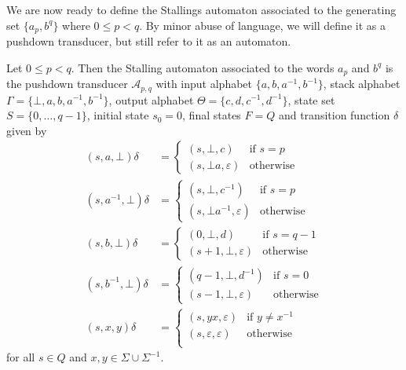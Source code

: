 We are now ready to define the Stallings automaton associated to the generating set $\{a_p, b^q\}$ where
$0 \leq p < q$. By minor abuse of language, we will define it as a pushdown transducer, but still refer to it
as an automaton.

\begin{definition}%
  \label{def:Stallings_automaton}
  \rocqok{}
  Let $0 \leq p < q$. Then the Stalling automaton associated to the words $a_p$ and $b^q$ is the pushdown transducer
  $\mathcal{A}_{p, q}$ with input alphabet $\{a, b, a^{-1}, b^{-1}\}$, stack alphabet
  $\Gamma = \{\bot, a, b, a^{-1}, b^{-1}\}$,
  output alphabet $\Theta = \{c, d, c^{-1}, d^{-1}\}$, state set $S = \{0, \ldots, q-1\}$, initial state $s_0 = 0$,
  final states $F = Q$ and transition function $\delta$ given by
  \begin{align*}
    (s, a, \bot)\delta &= \begin{cases}
      (s, \bot, c) & \textrm{if }s=p\\
      (s, \bot a, \varepsilon) & \textrm{otherwise}
    \end{cases} \\
    (s, a^{-1}, \bot)\delta &= \begin{cases}
      (s, \bot, c^{-1}) & \textrm{if }s=p\\
      (s, \bot a^{-1}, \varepsilon) & \textrm{otherwise}
    \end{cases} \\
    (s, b, \bot)\delta &= \begin{cases}
      (0, \bot, d) & \textrm{if }s = q - 1\\
      (s+1, \bot, \varepsilon) & \textrm{otherwise}
    \end{cases} \\
    (s, b^{-1}, \bot)\delta &= \begin{cases}
      (q-1, \bot, d^{-1}) & \textrm{if }s = 0\\
      (s-1, \bot, \varepsilon) & \textrm{otherwise}
    \end{cases} \\
    (s, x, y)\delta &= \begin{cases}
      (s, yx, \varepsilon) & \textrm{if }y\neq x^{-1}\\
      (s, \varepsilon, \varepsilon) & \textrm{otherwise}\\
    \end{cases}
  \end{align*}
  for all $s \in Q$ and $x, y \in \Sigma \cup \Sigma^{-1}$.
\end{definition}

